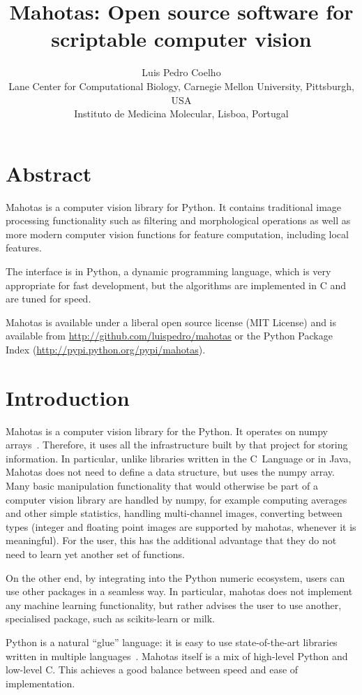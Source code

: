 \documentclass{article}
\title{Mahotas: Open source software for scriptable computer vision}
\author{Luis Pedro Coelho\\
Lane Center for Computational Biology, Carnegie Mellon University, Pittsburgh, USA\\
Instituto de Medicina Molecular, Lisboa, Portugal}
\newcommand*{\cpp}{{C\nolinebreak[4]\hspace{-.05em}\raisebox{.4ex}{\tiny\textbf{++}}}}
\begin{document}
\maketitle

\section*{Abstract}
Mahotas is a computer vision library for Python. It contains traditional image
processing functionality such as filtering and morphological operations as well
as more modern computer vision functions for feature computation, including
local features.

The interface is in Python, a dynamic programming language, which is very
appropriate for fast development, but the algorithms are implemented in \cpp{}
and are tuned for speed.

Mahotas is available under a liberal open source license (MIT License) and is
available from \url{http://github.com/luispedro/mahotas} or the Python Package
Index (\url{http://pypi.python.org/pypi/mahotas}).

\section{Introduction}

Mahotas is a computer vision library for the Python. It operates on numpy
arrays~\citep{numpystructure}. Therefore, it uses all the infrastructure built
by that project for storing information. In particular, unlike libraries
written in the C~Language or in Java, Mahotas does not need to define a data
structure, but uses the numpy array. Many basic manipulation functionality that
would otherwise be part of a computer vision library are handled by numpy, for
example computing averages and other simple statistics, handling multi-channel
images, converting between types (integer and floating point images are
supported by mahotas, whenever it is meaningful). For the user, this has the
additional advantage that they do not need to learn yet another set of
functions.

On the other end, by integrating into the Python numeric ecosystem, users can
use other packages in a seamless way. In particular, mahotas does not implement
any machine learning functionality, but rather advises the user to use another,
specialised package, such as scikits-learn or milk.

Python is a natural ``glue'' language: it is easy to use state-of-the-art
libraries written in multiple languages~\citep{10.1109/MCSE.2007.58}. Mahotas
itself is a mix of high-level Python and low-level \cpp{}. This achieves a good
balance between speed and ease of implementation.
\end{document}
